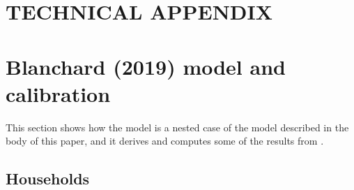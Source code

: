 \documentclass[letterpaper,12pt]{article}
\theoremstyle{definition}
\begin{document}




\newpage
\renewcommand{\theequation}{T.\arabic{section}.\arabic{equation}}
\renewcommand{\thesection}{T-\arabic{section}}   %

\setcounter{equation}{0}                         %
\setcounter{section}{0}                          %
\section*{TECHNICAL APPENDIX}


\setcounter{equation}{0}                         %
\section{Blanchard (2019) model and calibration}\label{SecTAppBlanch}

  This section shows how the \citet{Blanchard:2019} model is a nested case of the model described in the body of this paper, and it derives and computes some of the results from \citet{Blanchard:2019}.


  \subsection{Households}\label{SecTAppBlanchHH}
\end{document}
